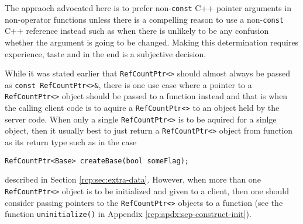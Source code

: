 The appraoch advocated here is to prefer non-\texttt{const} C++
pointer arguments in non-operator functions unless there is a
compelling reason to use a non-\texttt{const} C++ reference instead
such as when there is unlikely to be any confusion whether the
argument is going to be changed.  Making this determination requires
experience, taste and in the end is a subjective decision.

While it was stated earlier that {}\texttt{Ref\-Count\-Ptr<>} should
almost always be passed as {}\texttt{const Ref\-Count\-Ptr<>\&}, there
is one use case where a pointer to a {}\texttt{Ref\-Count\-Ptr<>}
object should be passed to a function instead and that is when the
calling client code is to aquire a {}\texttt{Ref\-Count\-Ptr<>} to an
object held by the server code.  When only a single
{}\texttt{Ref\-Count\-Ptr<>} is to be aquired for a sinlge object,
then it usually best to just return a {}\texttt{Ref\-Count\-Ptr<>}
object from function as its return type such as in the case

{\scriptsize\begin{verbatim}
RefCountPtr<Base> createBase(bool someFlag);
\end{verbatim}}

{}\noindent{}described in Section {}\ref{rcp:sec:extra-data}.
However, when more than one {}\texttt{Ref\-Count\-Ptr<>} object is to
be initialized and given to a client, then one should consider passing
pointers to the {}\texttt{Ref\-Count\-Ptr<>} objects to a function
(see the function {}\texttt{uninitialize()} in Appendix
{}\ref{rcp:apdx:sep-construct-init}).
